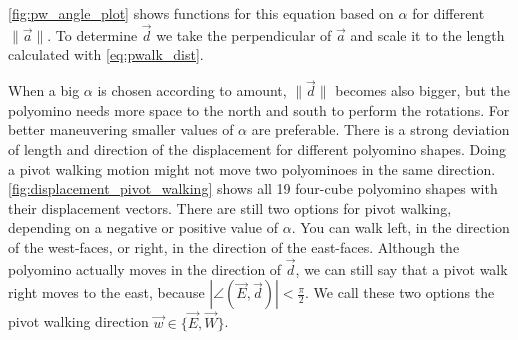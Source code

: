 \autoref{fig:pw_angle_plot} shows functions for this equation based on $\alpha$ for different $\lVert \vec{a} \rVert$.
To determine $\vec{d}$ we take the perpendicular of $\vec{a}$ and scale it to the length calculated with \autoref{eq:pwalk_dist}.

When a big $\alpha$ is chosen according to amount, $\lVert \vec{d} \rVert$ becomes also bigger, but the polyomino needs more space to the north and south to perform the rotations.
For better maneuvering smaller values of $\alpha$ are preferable.
There is a strong deviation of length and direction of the displacement for different polyomino shapes.
Doing a pivot walking motion might not move two polyominoes in the same direction.
\autoref{fig:displacement_pivot_walking} shows all 19 four-cube polyomino shapes with their displacement vectors.
There are still two options for pivot walking, depending on a negative or positive value of $\alpha$.
You can walk left, in the direction of the west-faces, or right, in the direction of the east-faces.
Although the polyomino actually moves in the direction of $\vec{d}$, we can still say that a pivot walk right moves to the east, because $\left| \angle \left( \vec{E}, \vec{d} \right) \right| < \frac{\pi}{2}$.
We call these two options the pivot walking direction $\vec{w} \in \{\vec{E}, \vec{W}\}$.
